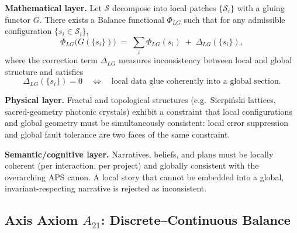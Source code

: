 \begin{axiom}
\label{ax:local-global}
\textbf{Mathematical layer.}
Let $\mathcal{S}$ decompose into local patches $\{\mathcal{S}_i\}$ with a gluing functor $G$.
There exists a Balance functional $\Phi_{LG}$ such that for any admissible configuration $\{s_i \in \mathcal{S}_i\}$,
\[
  \Phi_{LG}\bigl(G(\{s_i\})\bigr)
  \;=\;
  \sum_i \Phi_{LG}(s_i)
  \;+\;
  \Delta_{LG}(\{s_i\}),
\]
where the correction term $\Delta_{LG}$ measures inconsistency between local and global structure and satisfies
\[
  \Delta_{LG}(\{s_i\}) = 0
  \quad \Longleftrightarrow \quad
  \text{local data glue coherently into a global section}.
\]

\textbf{Physical layer.}
Fractal and topological structures (e.g.\ Sierpiński lattices, sacred-geometry photonic crystals) exhibit a constraint that local configurations and global geometry must be simultaneously consistent: local error suppression and global fault tolerance are two faces of the same constraint.\cite{AurphyxThesis,AurphyxFractalQC}

\textbf{Semantic/cognitive layer.}
Narratives, beliefs, and plans must be locally coherent (per interaction, per project) and globally consistent with the overarching APS canon.
A local story that cannot be embedded into a global, invariant-respecting narrative is rejected as inconsistent.
\end{axiom}

\subsection{Axis Axiom $A_{21}$: Discrete–Continuous Balance}

